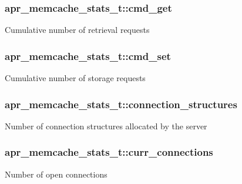 \subsubsection[{\texorpdfstring{cmd\+\_\+get}{cmd_get}}]{ apr\+\_\+memcache\+\_\+stats\+\_\+t\+::cmd\+\_\+get}\hypertarget{structapr__memcache__stats__t_abd9b0fa7bf554436883c8b6a2a89c2a8}{}\label{structapr__memcache__stats__t_abd9b0fa7bf554436883c8b6a2a89c2a8}
Cumulative number of retrieval requests 
\subsubsection[{\texorpdfstring{cmd\+\_\+set}{cmd_set}}]{ apr\+\_\+memcache\+\_\+stats\+\_\+t\+::cmd\+\_\+set}\hypertarget{structapr__memcache__stats__t_a4930557b41d879b1b4767862c1693f95}{}\label{structapr__memcache__stats__t_a4930557b41d879b1b4767862c1693f95}
Cumulative number of storage requests 
\subsubsection[{\texorpdfstring{connection\+\_\+structures}{connection_structures}}]{ apr\+\_\+memcache\+\_\+stats\+\_\+t\+::connection\+\_\+structures}\hypertarget{structapr__memcache__stats__t_ac155c7a510e94b3cd43aea90a05e3cd3}{}\label{structapr__memcache__stats__t_ac155c7a510e94b3cd43aea90a05e3cd3}
Number of connection structures allocated by the server 
\subsubsection[{\texorpdfstring{curr\+\_\+connections}{curr_connections}}]{ apr\+\_\+memcache\+\_\+stats\+\_\+t\+::curr\+\_\+connections}\hypertarget{structapr__memcache__stats__t_a1db1876674d978f4f70ae465a060bfc2}{}\label{structapr__memcache__stats__t_a1db1876674d978f4f70ae465a060bfc2}
Number of open connections 
